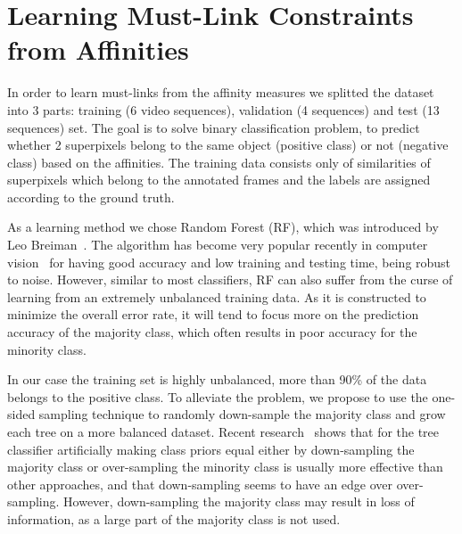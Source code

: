\section{Learning Must-Link Constraints from Affinities}%
\label{sec:ch4_ML}
In order to learn must-links from the affinity measures we splitted the dataset into 3 parts: training (6 video sequences), validation (4 sequences) and test (13 sequences) set.
The goal is to solve binary classification problem, to predict whether 2 superpixels belong to the same object (positive class) or not (negative class) based on the affinities. 
The training data consists only of similarities of superpixels which belong to the annotated frames and the labels are assigned according to the ground truth.

As a learning method we chose Random Forest (RF), which was introduced by Leo Breiman~\cite{Breiman01}. The algorithm has become very popular recently in computer vision~\cite{KontschiederBBP11,LimZD13,DollarICCV13edges} 
for having good accuracy and low training and testing time, being robust to noise. However, similar to most classifiers, RF can also suffer from the curse of learning from an extremely unbalanced training data. 
As it is constructed to minimize the overall error rate, it will tend to focus more on the prediction accuracy of the majority class, which often results in poor accuracy for the minority class. 

In our case the training set is highly unbalanced, more than 90\% of the data belongs to the positive class.
To alleviate the problem, we propose to use the one-sided sampling technique to randomly down-sample the majority class
and grow each tree on a more balanced dataset.
Recent research~\cite{Drummond03,Breiman04} shows that for the tree classifier artificially making class priors equal either by down-sampling the majority class or over-sampling
the minority class is usually more effective than other approaches, and that down-sampling seems to have an edge over over-sampling. However, down-sampling the majority class may result
in loss of information, as a large part of the majority class is not used. 

